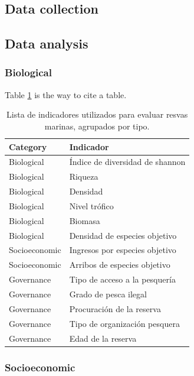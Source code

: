 \documentclass{frontiersSCNS}
\begin{document}
\subsection{Data collection}\label{data-collection}

\subsection{Data analysis}\label{data-analysis}

\subsubsection{Biological}\label{biological}

Table \ref{table:indicators} is the way to cite a table.

\begin{table}

\caption{\label{tab:unnamed-chunk-2}\label{table:indicators}Lista de indicadores utilizados para evaluar resvas marinas, agrupados por tipo.}
\centering
\begin{tabular}[t]{l|l}
\hline
Category & Indicador\\
\hline
Biological & Índice de diversidad de shannon\\
\hline
Biological & Riqueza\\
\hline
Biological & Densidad\\
\hline
Biological & Nivel trófico\\
\hline
Biological & Biomasa\\
\hline
Biological & Densidad de especies objetivo\\
\hline
Socioeconomic & Ingresos por especies objetivo\\
\hline
Socioeconomic & Arribos de especies objetivo\\
\hline
Governance & Tipo de acceso a la pesquería\\
\hline
Governance & Grado de pesca ilegal\\
\hline
Governance & Procuración de la reserva\\
\hline
Governance & Tipo de organización pesquera\\
\hline
Governance & Edad de la reserva\\
\hline
\end{tabular}
\end{table}

\subsubsection{Socioeconomic}\label{socioeconomic}
\end{document}
